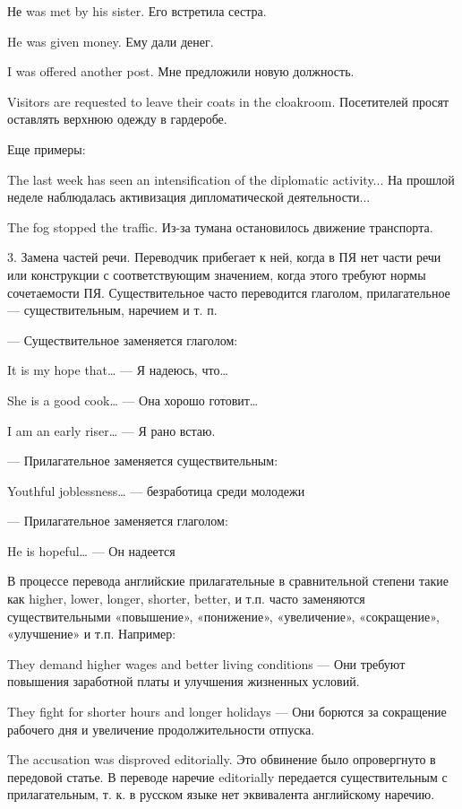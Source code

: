 Не was met by his sister. Его встретила сестра.

He was given money. Ему дали денег.

I was offered another post. Мне предложили новую должность.

Visitors are requested to leave their coats in the cloakroom. Посетителей просят оставлять верхнюю одежду в гардеробе.

Еще примеры:

The last week has seen an intensification of the diplomatic activity... На прошлой неделе наблюдалась активизация дипломатической деятельности...

The fog stopped the traffic. Из-за тумана остановилось движение транспорта.

3. Замена частей речи. Переводчик прибегает к ней, когда в ПЯ нет части речи или конструкции с соответствующим значением, когда этого требуют нормы сочетаемости ПЯ. Существительное часто переводится глаголом, прилагательное — существительным, наречием и т. п.

--- Существительное заменяется глаголом:

It is my hope that… --- Я надеюсь, что…

She is a good cook… --- Она хорошо готовит…

I am an early riser… --- Я рано встаю.

--- Прилагательное заменяется существительным:

Youthful joblessness… --- безработица среди молодежи

--- Прилагательное заменяется глаголом:

He is hopeful… --- Он надеется

В процессе перевода английские прилагательные в сравнительной степени такие как higher, lower, longer, shorter, better, и т.п. часто заменяются существительными «повышение», «понижение», «увеличение», «сокращение», «улучшение» и т.п. Например:

They demand higher wages and better living conditions --- Они требуют повышения заработной платы и улучшения жизненных условий.

They fight for shorter hours and longer holidays --- Они борются за сокращение рабочего дня и увеличение продолжительности отпуска.

The accusation was disproved editorially. Это обвинение было опровергнуто в передовой статье. В переводе наречие editorially передается существительным с прилагательным, т. к. в русском языке нет эквивалента английскому наречию.

